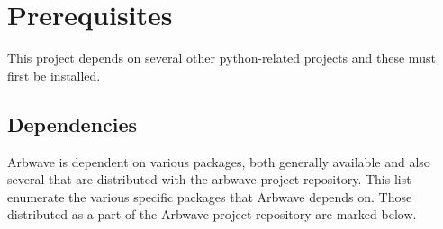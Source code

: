 \thispagestyle{fancy}
\pagestyle{fancy}

\section{Prerequisites}

This project depends on several other python-related projects and these must
first be installed.

\subsection{Dependencies}
Arbwave is dependent on various packages, both generally available and also
several that are distributed with the arbwave project repository.  This list
enumerate the various specific packages that Arbwave depends on.  Those
distributed as a part of the Arbwave project repository are marked below.


